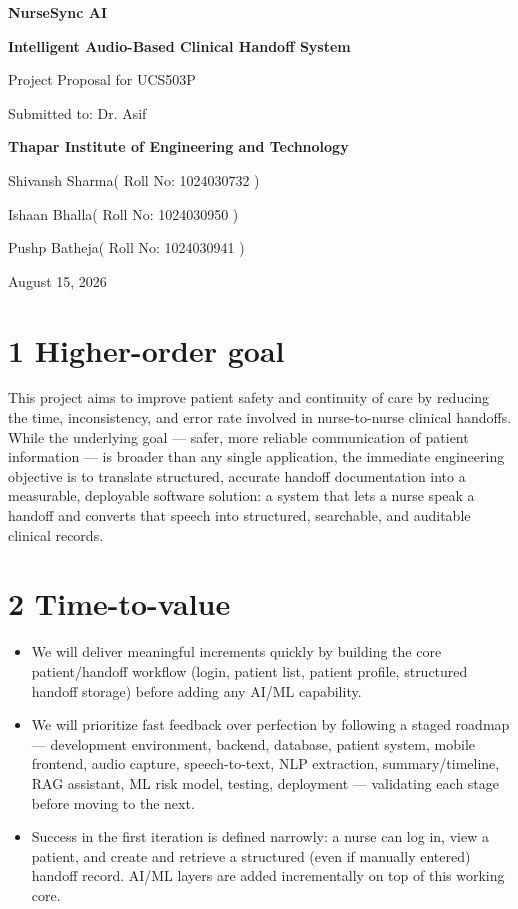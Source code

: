 \documentclass[
]{article}
\author{}
\date{}
\begin{document}
\textbf{NurseSync AI}

\textbf{Intelligent Audio-Based Clinical Handoff System}

Project Proposal for UCS503P

Submitted to: Dr. Asif

\textbf{Thapar Institute of Engineering and Technology}

Shivansh Sharma( Roll No: 1024030732 )

Ishaan Bhalla( Roll No: 1024030950 )

Pushp Batheja( Roll No: 1024030941 )

August 15, 2026

\section{1 Higher-order goal}\label{higher-order-goal}

This project aims to improve patient safety and continuity of care by
reducing the time, inconsistency, and error rate involved in
nurse-to-nurse clinical handoffs. While the underlying goal --- safer,
more reliable communication of patient information --- is broader than
any single application, the immediate engineering objective is to
translate structured, accurate handoff documentation into a measurable,
deployable software solution: a system that lets a nurse speak a handoff
and converts that speech into structured, searchable, and auditable
clinical records.

\section{2 Time-to-value}\label{time-to-value}

\begin{itemize}
\item
  We will deliver meaningful increments quickly by building the core
  patient/handoff workflow (login, patient list, patient profile,
  structured handoff storage) before adding any AI/ML capability.
\item
  We will prioritize fast feedback over perfection by following a staged
  roadmap --- development environment, backend, database, patient
  system, mobile frontend, audio capture, speech-to-text, NLP
  extraction, summary/timeline, RAG assistant, ML risk model, testing,
  deployment --- validating each stage before moving to the next.
\item
  Success in the first iteration is defined narrowly: a nurse can log
  in, view a patient, and create and retrieve a structured (even if
  manually entered) handoff record. AI/ML layers are added incrementally
  on top of this working core.
\end{itemize}
\end{document}
